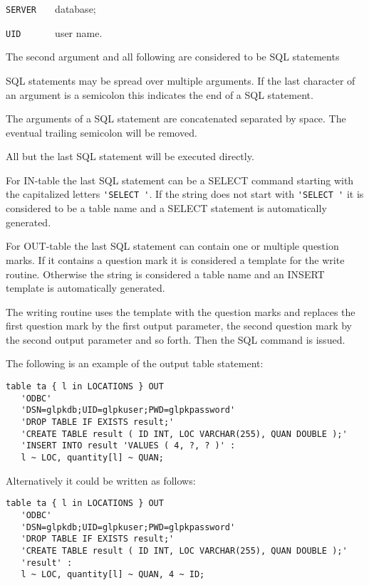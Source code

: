 \documentclass[11pt]{report}
\begin{document}
\verb|SERVER   | database;

\verb|UID      | user name.

The second argument and all following are considered to be SQL
statements

SQL statements may be spread over multiple arguments.  If the last
character of an argument is a semicolon this indicates the end of
a SQL statement.

The arguments of a SQL statement are concatenated separated by space.
The eventual trailing semicolon will be removed.

All but the last SQL statement will be executed directly.

For IN-table the last SQL statement can be a SELECT command starting
with the capitalized letters \verb|'SELECT '|. If the string does not
start with \verb|'SELECT '| it is considered to be a table name and a
SELECT statement is automatically generated.

For OUT-table the last SQL statement can contain one or multiple
question marks. If it contains a question mark it is considered a
template for the write routine. Otherwise the string is considered a
table name and an INSERT template is automatically generated.

The writing routine uses the template with the question marks and
replaces the first question mark by the first output parameter, the
second question mark by the second output parameter and so forth. Then
the SQL command is issued.

The following is an example of the output table statement:

\begin{verbatim}
table ta { l in LOCATIONS } OUT
   'ODBC'
   'DSN=glpkdb;UID=glpkuser;PWD=glpkpassword'
   'DROP TABLE IF EXISTS result;'
   'CREATE TABLE result ( ID INT, LOC VARCHAR(255), QUAN DOUBLE );'
   'INSERT INTO result 'VALUES ( 4, ?, ? )' :
   l ~ LOC, quantity[l] ~ QUAN;
\end{verbatim}

\newpage

\noindent
Alternatively it could be written as follows:

\begin{verbatim}
table ta { l in LOCATIONS } OUT
   'ODBC'
   'DSN=glpkdb;UID=glpkuser;PWD=glpkpassword'
   'DROP TABLE IF EXISTS result;'
   'CREATE TABLE result ( ID INT, LOC VARCHAR(255), QUAN DOUBLE );'
   'result' :
   l ~ LOC, quantity[l] ~ QUAN, 4 ~ ID;
\end{verbatim}
\end{document}
